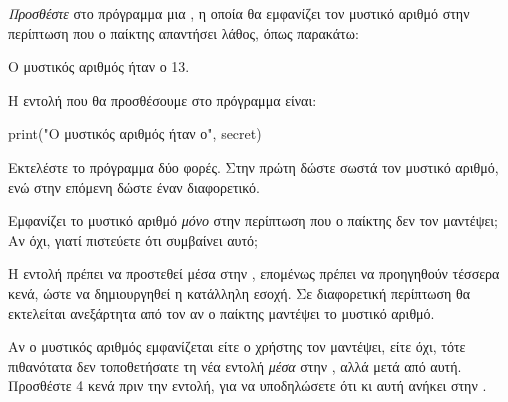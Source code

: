 \documentclass[a4paper,11pt,oneside]{book}
\begin{document}
\begin{step}
\label{step:secret-print}

\emph{Προσθέστε} στο πρόγραμμα μια , η οποία θα εμφανίζει τον μυστικό αριθμό στην περίπτωση που ο παίκτης απαντήσει λάθος, όπως παρακάτω:

\marginnote[16pt]{\iconcomputer}
\begin{pyterm}
Ο μυστικός αριθμός ήταν ο 13.
\end{pyterm}

\begin{answer}
Η εντολή που θα προσθέσουμε στο πρόγραμμα είναι:
	
\begin{pynew}
    print("Ο μυστικός αριθμός ήταν ο", secret)
\end{pynew}
\end{answer}

Εκτελέστε το πρόγραμμα δύο φορές. Στην πρώτη δώστε σωστά τον μυστικό αριθμό, ενώ στην επόμενη δώστε έναν διαφορετικό.

Εμφανίζει το μυστικό αριθμό \emph{μόνο} στην περίπτωση που ο παίκτης δεν τον μαντέψει; Αν όχι, γιατί πιστεύετε ότι συμβαίνει αυτό;

\begin{answer}
	Η εντολή πρέπει να προστεθεί μέσα στην , επομένως πρέπει να προηγηθούν τέσσερα κενά, ώστε να δημιουργηθεί η κατάλληλη εσοχή. Σε διαφορετική περίπτωση θα εκτελείται ανεξάρτητα από τον αν ο παίκτης μαντέψει το μυστικό αριθμό.
\end{answer}

\marginnote[16pt]{\iconcaution}
Αν ο μυστικός αριθμός εμφανίζεται είτε ο χρήστης τον μαντέψει, είτε όχι, τότε πιθανότατα δεν τοποθετήσατε τη νέα εντολή \emph{μέσα} στην , αλλά μετά από αυτή. Προσθέστε 4 κενά πριν την εντολή, για να υποδηλώσετε ότι κι αυτή ανήκει στην .
\end{step}
\end{document}
